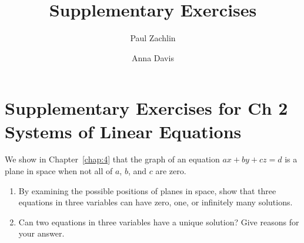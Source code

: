 \documentclass{ximera}
\author{Paul Zachlin \and Anna Davis} \title{Supplementary Exercises} \license{CC-BY 4.0}
\begin{document}
\begin{abstract}
\end{abstract}
\maketitle

\section*{Supplementary Exercises for Ch 2 Systems of Linear Equations}



\begin{problem}\label{prb:possible}
We show in Chapter~\ref{chap:4} that the graph of an equation $ax + by + cz = d$ is a plane in space when not all of $a$, $b$, and $c$ are zero.

\begin{enumerate}
\item By examining the possible positions of planes in space, show that three equations in three variables can have zero, one, or infinitely many solutions.

\item Can two equations in three variables have a unique solution? Give reasons for your answer.
\end{enumerate}
\end{problem}
\end{document}
